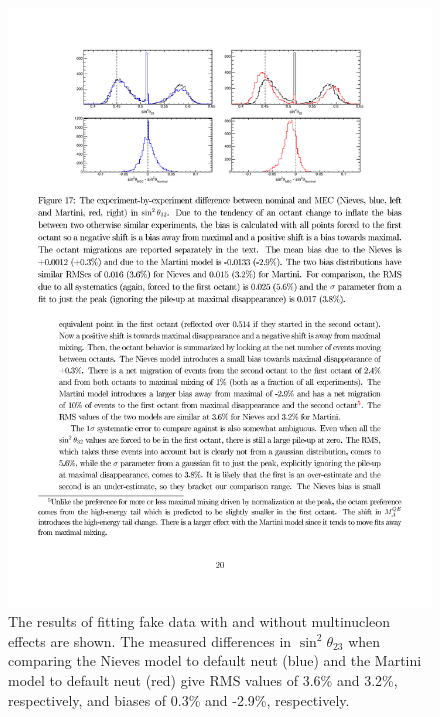 \begin{figure}[htpb]
\begin{center}
\begin{minipage}[t]{.45\textwidth}
\begin{center}
      \includegraphics[width=\textwidth] {figures/martini_theta23.pdf}
    \end{center}
  \end{minipage}
\end{center}
\caption{The results of fitting fake data with and without multinucleon effects are shown. The measured differences in $\sin^2\theta_{23}$ when comparing the Nieves model to default neut (blue) and the Martini model to default neut (red) give RMS values of 3.6\% and 3.2\%, respectively, and biases of 0.3\% and -2.9\%, respectively.}
\label{fig:nievesmartini}
\end{figure}

